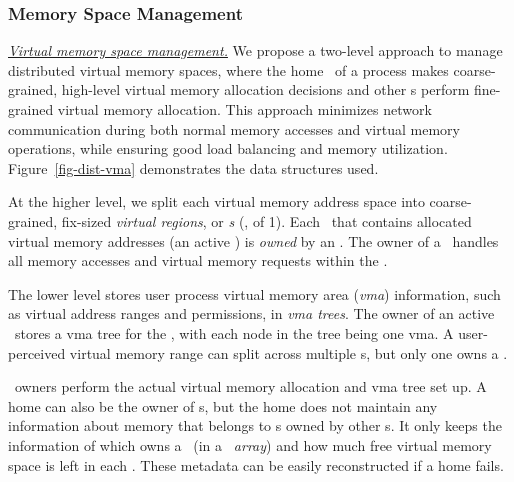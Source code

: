 \subsubsection{Memory Space Management}
\textit{\uline{Virtual memory space management.}}
We propose a two-level approach to manage distributed virtual memory spaces,
where the home \mcomponent\ of a process makes coarse-grained, high-level virtual memory allocation decisions
and other \mcomponent{}s perform fine-grained virtual memory allocation.
This approach minimizes network communication during both normal memory accesses and virtual memory operations,
while ensuring good load balancing and memory utilization.
Figure~\ref{fig-dist-vma} demonstrates the data structures used. %

At the higher level, we split each virtual memory address space into coarse-grained, fix-sized {\em virtual regions},
or {\em \vregion{}s} (\eg, of 1\GB).
Each \vregion\ that contains allocated virtual memory addresses (an active \vregion) is {\em owned} by an \mcomponent{}.
The owner of a \vregion\ handles all memory accesses and virtual memory requests within the \vregion.


The lower level stores user process virtual memory area ({\em vma}) information,
such as virtual address ranges and permissions, in {\em vma trees}.
The owner of an active \vregion\ stores a vma tree for the \vregion,
with each node in the tree being one vma.
A user-perceived virtual memory range can split across multiple \mcomponent{}s,
but only one \mcomponent{} owns a \vregion.

\vregion\ owners perform the actual virtual memory allocation and vma tree set up.
A home \mcomponent{} can also be the owner of \vregion{}s,
but the home \mcomponent{} does not maintain any information about memory that belongs to \vregion{}s owned by other \mcomponent{}s.
It only keeps the information of which \mcomponent{} owns a \vregion\ (in a {\em \vregion\ array})
and how much free virtual memory space is left in each \vregion.
These metadata can be easily reconstructed if a home \mcomponent{} fails.

